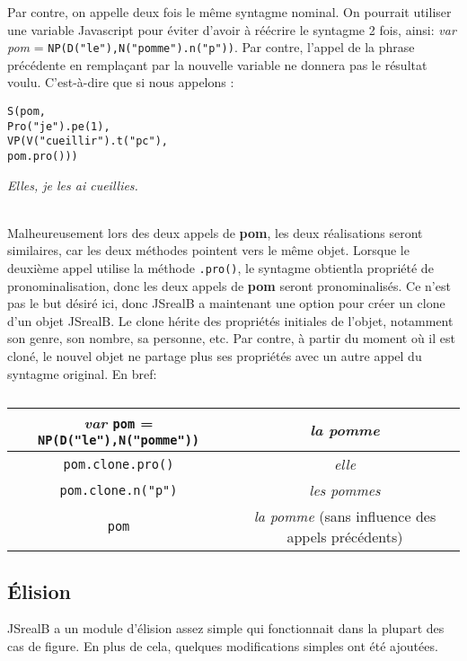 \documentclass[11pt]{article} %
\newcommand{\system}[1]{\textsf{#1}}
\newcommand{\JSB}{\system{JSrealB}}
\newcommand{\real}[1]{\emph{#1}}
\begin{document}
Par contre, on appelle deux fois le même syntagme nominal. On pourrait
utiliser une variable Javascript pour éviter d'avoir à réécrire le
syntagme 2 fois, ainsi: \emph{var pom} = \texttt{NP(D("le"),N("pomme").n("p"))}. Par contre, l'appel de la phrase précédente en remplaçant par la
nouvelle variable ne donnera pas le résultat voulu. C'est-à-dire que
si nous appelons : 
\begin{example}
\caption{}
\begin{alltt}
S(pom,
  Pro("je").pe(1),
  VP(V("cueillir").t("pc"),
     pom.pro()))
\end{alltt}
\real{Elles, je les ai cueillies.}
\end{example}
\\


Malheureusement lors des deux appels de \textbf{pom}, les deux réalisations
seront similaires, car les deux méthodes pointent vers le même objet.
Lorsque le deuxième appel utilise la méthode \texttt{.pro()}, le syntagme
obtientla propriété de pronominalisation, donc les deux appels de
\textbf{pom} seront pronominalisés. Ce n'est pas le but désiré ici,
donc \JSB{} a maintenant une option pour créer un clone d'un objet
\JSB{}. Le clone hérite des propriétés initiales de l'objet, notamment
son genre, son nombre, sa personne, etc. Par contre, à partir du moment
où il est cloné, le nouvel objet ne partage plus ses propriétés avec
un autre appel du syntagme original. En bref: \\
\begin{table}
\caption{}
\begin{tabular}{|c|c|}
\hline 
\emph{var} \texttt{pom} = \texttt{NP(D("le"),N("pomme"))} & \real{la pomme}\\
\hline 
\hline 
\texttt{pom.clone.pro()} & \real{elle}\\
\hline 
\texttt{pom.clone.n("p")} & \real{les pommes}\\
\hline 
\texttt{pom} & \real{la pomme} {\small{}(sans influence des appels
précédents)}\\
\hline 
\end{tabular} 
\end{table}

\subsection{Élision}

\JSB{} a un module d'élision assez simple qui fonctionnait dans la plupart des cas de figure.
En plus de cela, quelques modifications simples ont été ajoutées.
\end{document}

